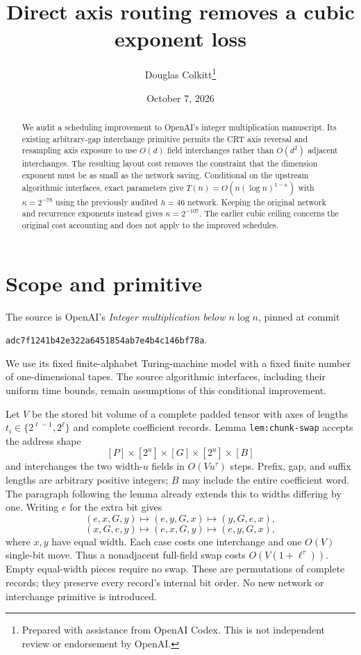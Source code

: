 \documentclass[11pt]{article}
\title{Direct axis routing removes a cubic exponent loss}
\author{Douglas Colkitt\thanks{Prepared with assistance from OpenAI Codex. This is not independent review or endorsement by OpenAI.}}
\date{October 7, 2026}
\begin{document}
\maketitle
\begin{abstract}
We audit a scheduling improvement to OpenAI's integer multiplication manuscript.
Its existing arbitrary-gap interchange primitive permits the CRT axis reversal
and resampling axis exposure to use $O(d)$ field interchanges rather than
$O(d^2)$ adjacent interchanges. The resulting layout cost removes the constraint
that the dimension exponent must be as small as the network saving. Conditional
on the upstream algorithmic interfaces, exact parameters give
$T(n)=O(n(\log n)^{1-\kappa})$ with $\kappa=2^{-78}$ using the previously
audited $h=46$ network. Keeping the original network and recurrence exponents
instead gives $\kappa=2^{-107}$. The earlier cubic ceiling concerns the original
cost accounting and does not apply to the improved schedules.
\end{abstract}

\section{Scope and primitive}
The source is OpenAI's \emph{Integer multiplication below $n\log n$}, pinned at
commit
\begin{center}
\texttt{adc7f1241b42e322a6451854ab7e4b4c146bf78a}.
\end{center}
We use its fixed
finite-alphabet Turing-machine model with a fixed finite number of
one-dimensional tapes. The source algorithmic interfaces, including their
uniform time bounds, remain assumptions of this conditional improvement.

Let $V$ be the stored bit volume of a complete padded tensor with axes of
lengths $t_i\in\{2^{\ell-1},2^\ell\}$ and complete coefficient records.
Lemma \texttt{lem:chunk-swap} accepts the address shape
\[
 [P]\times[2^u]\times[G]\times[2^u]\times[B]
\]
and interchanges the two width-$u$ fields in $O(Vu^\tau)$ steps. Prefix,
gap, and suffix lengths are arbitrary positive integers; $B$ may include the
entire coefficient word. The paragraph following the lemma already extends
this to widths differing by one. Writing $e$ for the extra bit gives
\[
 (e,x,G,y)\longmapsto(e,y,G,x)\longmapsto(y,G,e,x),
\]
\[
 (x,G,e,y)\longmapsto(e,x,G,y)\longmapsto(e,y,G,x),
\]
where $x,y$ have equal width. Each case costs one interchange and one
$O(V)$ single-bit move. Thus a nonadjacent full-field swap costs
$O(V(1+\ell^\tau))$. Empty equal-width pieces require no swap.
These are permutations of complete records; they preserve every record's
internal bit order. No new network or interchange primitive is introduced.
\end{document}
